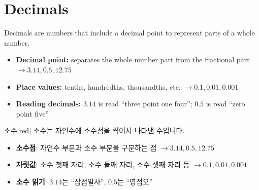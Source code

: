 \documentclass[12pt]{book}
\begin{document}
  
  
  
  
  
  
  
  
  \twosidedpaper
  \section{Decimals}
  
  Decimals are numbers that include a decimal point to represent parts of a whole number.
  \begin{itemize}
    \item \textbf{Decimal point:} separates the whole number part from the fractional part  
      $\rightarrow 3.14, 0.5, 12.75$
    \item \textbf{Place values:} tenths, hundredths, thousandths, etc.  
      $\rightarrow 0.1, 0.01, 0.001$
    \item \textbf{Reading decimals:} $3.14$ is read “three point one four”;  
      $0.5$ is read “zero point five”
  \end{itemize}
  
  \begin{flexbox}{소수}[red]
  소수는 자연수에 소수점을 찍어서 나타낸 수입니다.
  \begin{itemize}
    \item \textbf{소수점}: 자연수 부분과 소수 부분을 구분하는 점  
      $\rightarrow 3.14, 0.5, 12.75$
    \item \textbf{자릿값}: 소수 첫째 자리, 소수 둘째 자리, 소수 셋째 자리 등  
      $\rightarrow 0.1, 0.01, 0.001$
    \item \textbf{소수 읽기}: $3.14$는 “삼점일사”, $0.5$는 “영점오”
  \end{itemize}
  \end{flexbox}
  
\end{document}
